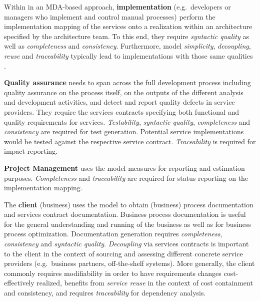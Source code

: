 Within in an MDA-based approach, {\bf implementation} (e.g.\ developers or managers who implement and control manual processes) perform the implementation mapping of the services onto a realization within an architecture specified by the architecture team. To this end, they require \emph{syntactic quality} as well as \emph{completeness} and \emph{consistency}. Furthermore, model \emph{simplicity}, \emph{decoupling}, \emph{reuse} and \emph{traceability} typically lead to implementations with those same qualities \cite{podgorelec_estimating_2007}.

{\bf Quality assurance} needs to span across the full development process including quality assurance on the process itself, on the outputs of the different analysis and development activities, and detect and report quality defects in service providers. They require the services contracts specifying both functional and quality requirements for services. \emph{Testability}, \emph{syntactic quality}, \emph{completeness} and \emph{consistency} are required for test generation. Potential service implementations would be tested against the respective service contract. \emph{Traceability} is required for impact reporting.

{\bf Project Management} uses the model measures for reporting and estimation purposes. \emph{Completeness} and \emph{traceability} are required for status reporting on the implementation mapping.

The {\bf client} (business) uses the model to obtain (business) process documentation and services contract documentation. Business process documentation is useful for the general understanding and running of the business as well as for business process optimization. Documentation generation requires \emph{completeness}, \emph{consistency} and \emph{syntactic quality}. \emph{Decoupling} via services contracts is important to the client in the context of sourcing and assessing different concrete service providers (e.g.\ business partners, off-the-shelf systems). More generally, the client commonly requires modifiability in order to have requirements changes cost-effectively realized, benefits from \emph{service reuse} in the context of cost containment and consistency, and requires \emph{traceability} for dependency analysis.


